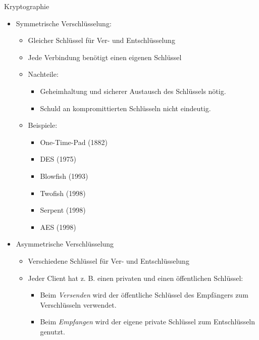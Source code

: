 \begin{bonus}{Kryptographie}
    \begin{itemize}
        \item Symmetrische Verschlüsselung:
              \begin{itemize}
                  \item Gleicher Schlüssel für Ver- und Entschlüsselung
                  \item Jede Verbindung benötigt einen eigenen Schlüssel
                  \item Nachteile:
                        \begin{itemize}
                            \item Geheimhaltung und sicherer Austausch des Schlüssels nötig.
                            \item Schuld an kompromittierten Schlüsseln nicht eindeutig.
                        \end{itemize}
                  \item Beispiele:
                        \begin{itemize}
                            \item One-Time-Pad (1882)
                            \item DES (1975)
                            \item Blowfish (1993)
                            \item Twofish (1998)
                            \item Serpent (1998)
                            \item AES (1998)
                        \end{itemize}
              \end{itemize}
        \item Asymmetrische Verschlüsselung
              \begin{itemize}
                  \item Verschiedene Schlüssel für Ver- und Entschlüsselung
                  \item Jeder Client hat z. B. einen privaten und einen öffentlichen Schlüssel:
                        \begin{itemize}
                            \item Beim \emph{Versenden} wird der öffentliche Schlüssel des Empfängers zum Verschlüsseln verwendet.
                            \item Beim \emph{Empfangen} wird der eigene private Schlüssel zum Entschlüsseln genutzt.

\end{itemize}
\end{itemize}
\end{itemize}
\end{bonus}
